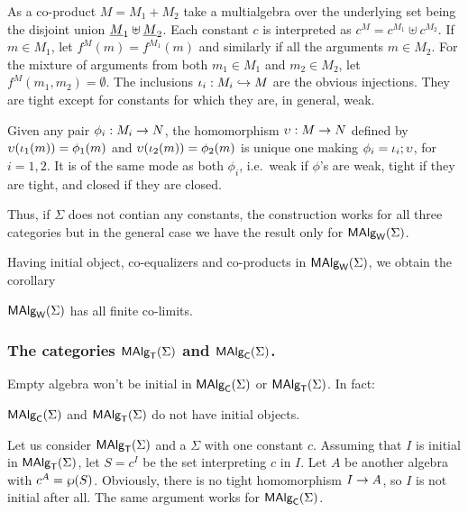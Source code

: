 \documentclass[10pt]{article}
\begin{document}
\begin{Proof}
As a co-product $M=M_1+M_2$ take a multialgebra over the underlying
set being the disjoint union $\underline {M}_1 \uplus \underline {M}_2$.  Each
constant $c$ is interpreted as $c^M=c^{M_1}\uplus c^{M_2}$.  If
$m \in M_1$, let
$f^M(m)=f^{M_1}(m)$ and similarly if all the
arguments $m\in M_2$. For the mixture of arguments from both
$m_1\in M_1$ and $m_2\in M_2$, let
$f^M(m_1,m_2)=\emptyset$. The inclusions $\iota_i:M_i\hookrightarrow M$
are the obvious injections. They are tight except for constants for
which they are, in general, weak.

Given any pair $\phi_i:M_i\rightarrow N$, the homomorphism $\upsilon:M\rightarrow N$
defined by $\upsilon(\iota_1(m))=\phi_1(m)$ and
$\upsilon(\iota_2(m))=\phi_2(m)$ is unique one making
$\phi_i=\iota_i;\upsilon$, for $i=1,2$. It is of the same mode as
both $\phi_i$, i.e.\ weak if $\phi$'s are weak, tight if they are
tight, and closed if they are closed.

Thus, if $\Sigma$ does not contian any constants, the construction
works for all three categories but in the general case we have the
result only for $\mbox{\rm\sf MAlg}_{\sf W}(\Sigma)$.
\end{Proof}

\noindent
Having initial object, co-equalizers and co-products in $\mbox{\rm\sf MAlg}_{\sf W}(\Sigma)$, we
obtain the corollary

\begin{Theorem}
\label{th:cocomp}
$\mbox{\rm\sf MAlg}_{\sf W}(\Sigma)$ has all finite co-limits.
\end{Theorem}


\subsubsection{The categories $\mbox{\rm\sf MAlg}_{\sf T}(\Sigma)$ and $\mbox{\rm\sf MAlg}_{\sf C}(\Sigma)$.}

Empty algebra won't be initial in $\mbox{\rm\sf MAlg}_{\sf C}(\Sigma)$ or $\mbox{\rm\sf MAlg}_{\sf T}(\Sigma)$. In fact:


\begin{Fact}
\label{le:noinit}
$\mbox{\rm\sf MAlg}_{\sf C}(\Sigma)$ and $\mbox{\rm\sf MAlg}_{\sf T}(\Sigma)$ do not have initial objects.
\end{Fact}

\begin{Proof}
Let us consider $\mbox{\rm\sf MAlg}_{\sf T}(\Sigma)$ and a $\Sigma$ with one constant $c$. Assuming
that $I$ is initial in $\mbox{\rm\sf MAlg}_{\sf T}(\Sigma)$, let $S=c^I$ be the set interpreting
$c$ in $I$.  Let $A$ be another algebra with
$c^A=\wp(S)$. Obviously, there is no tight homomorphism $I\rightarrow A$,
so $I$ is not initial after all. The same argument works for $\mbox{\rm\sf MAlg}_{\sf C}(\Sigma)$.
\end{Proof}
\end{document}
